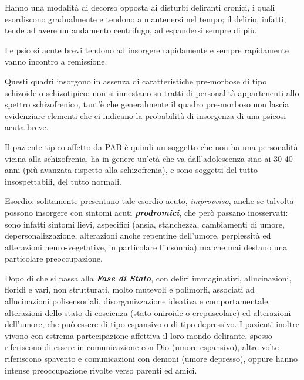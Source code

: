 Hanno una modalità di decorso opposta ai disturbi deliranti cronici, i
quali esordiscono gradualmente e tendono a mantenersi nel tempo; il
delirio, infatti, tende ad avere un andamento centrifugo, ad espandersi
sempre di più.

Le psicosi acute brevi tendono ad insorgere rapidamente e sempre
rapidamente vanno incontro a remissione.

Questi quadri insorgono in assenza di caratteristiche pre-morbose di
tipo schizoide o schizotipico: non si innestano su tratti di personalità
appartenenti allo spettro schizofrenico, tant'è che generalmente il
quadro pre-morboso non lascia evidenziare elementi che ci indicano la
probabilità di insorgenza di una psicosi acuta breve.

Il paziente tipico affetto da PAB è quindi un soggetto che non ha una
personalità vicina alla schizofrenia, ha in genere un'età che va
dall'adolescenza sino ai 30-40 anni (più avanzata rispetto alla
schizofrenia), e sono soggetti del tutto insospettabili, del tutto
normali.

Esordio: solitamente presentano tale esordio acuto, \emph{improvviso},
anche se talvolta possono insorgere con sintomi acuti
\textbf{\emph{prodromici}}, che però passano inosservati: sono infatti
sintomi lievi, aspecifici (ansia, stanchezza, cambiamenti di umore,
depersonalizzazione, alterazioni anche repentine dell'umore, perplessità
ed alterazioni neuro-vegetative, in particolare l'insonnia) ma che mai
destano una particolare preoccupazione.

Dopo di che si passa alla \textbf{\emph{Fase di Stato}}, con deliri
immaginativi, allucinazioni, floridi e vari, non strutturati, molto
mutevoli e polimorfi, associati ad allucinazioni polisensoriali,
disorganizzazione ideativa e comportamentale, alterazioni dello stato di
coscienza (stato oniroide o crepuscolare) ed alterazioni dell'umore, che
può essere di tipo espansivo o di tipo depressivo. I pazienti inoltre
vivono con estrema partecipazione affettiva il loro mondo delirante,
spesso riferiscono di essere in comunicazione con Dio (umore espansivo),
altre volte riferiscono spavento e comunicazioni con demoni (umore
depresso), oppure hanno intense preoccupazione rivolte verso parenti ed
amici.


